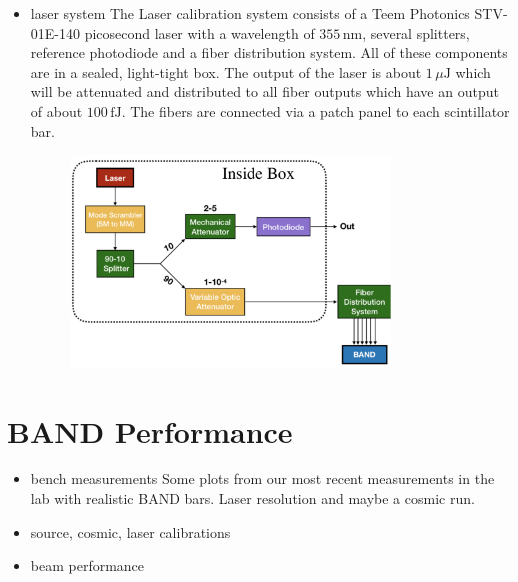 \documentclass[review]{elsarticle}
\begin{document}
\begin{itemize}
\item laser system
The Laser calibration system consists of a Teem Photonics STV-01E-140 picosecond laser with a wavelength of $355\,\mathrm{nm}$, several splitters, reference photodiode and a fiber distribution system. All of these components are in a sealed, light-tight box. The output of the laser is about $1\,\mu\mathrm{J}$ which will be attenuated and distributed to all fiber outputs which have an output of about $100\,\mathrm{fJ}$. The fibers are connected via a patch panel to each scintillator bar. 
\begin{figure}[h!]
\centering
\includegraphics[width=0.8\textwidth]{figures/laser.png}
\caption{}
\end{figure}


\end{itemize}




\section{BAND Performance}

\begin{itemize}
\item bench measurements
Some plots from our most recent measurements in the lab with realistic BAND bars. Laser resolution and maybe a cosmic run.

\item source, cosmic, laser calibrations
\item beam performance
\end{itemize}
\end{document}
